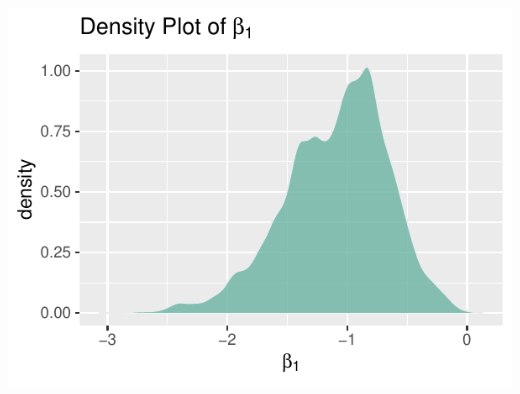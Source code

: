 \documentclass[11pt,english]{article}\usepackage[]{graphicx}\usepackage[]{xcolor}
\makeatletter
\def\maxwidth{ %
  \ifdim\Gin@nat@width>\linewidth
    \linewidth
  \else
    \Gin@nat@width
  \fi
}
\newenvironment{knitrout}{}{} %
\makeatother
\begin{document}
\begin{center}
\begin{knitrout}
\includegraphics[width=\maxwidth]{figure/unnamed-chunk-29-2} 
\end{knitrout}
\par\end{center}
\end{document}

